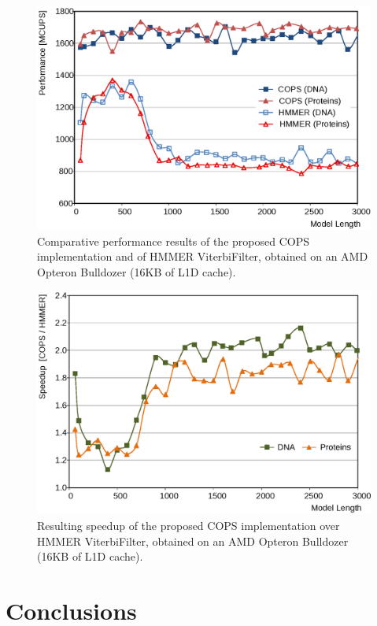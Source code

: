 \documentclass{bmcart}
\begin{document}
\begin{figure}[!b]
  \centering
  \includegraphics[width=12cm]{img/AMD-Perf.eps} 
  \caption{Comparative performance results of the proposed COPS implementation and of HMMER ViterbiFilter, obtained on an AMD Opteron Bulldozer (16KB of L1D cache).}
  \label{runtimes-aleph}
\end{figure}

\begin{figure}[!b]
  \centering
  \includegraphics[width=12cm]{img/AMD-speedup.eps}
  \caption{Resulting speedup of the proposed COPS implementation over HMMER ViterbiFilter, obtained on an AMD Opteron Bulldozer (16KB of L1D cache).}
  \label{speedups-aleph}
\end{figure}
 

\section*{Conclusions}
\end{document}
